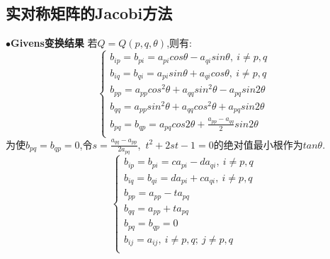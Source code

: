 \documentclass[UTF8]{article}
\newcommand{\keypoint}[2]{$\bullet$\textbf{#1}\quad#2\par}
\begin{document}
\subsection{实对称矩阵的Jacobi方法}
\keypoint{Givens变换结果}{
	若$Q=Q(p,q,\theta)$,则有:
	$$ \left\{
	\begin{array}{l}
	b_{ip}=b_{pi}=a_{pi}cos\theta-a_{qi}sin\theta,\ i\not=p,q\\
	b_{iq}=b_{qi}=a_{pi}sin\theta+a_{qi}cos\theta,\ i\not=p,q\\
	b_{pp}=a_{pp}cos^2\theta+a_{qq}sin^2\theta-a_{pq}sin2\theta\\
	b_{qq}=a_{pp}sin^2\theta+a_{qq}cos^2\theta+a_{pq}sin2\theta\\
	b_{pq}=b_{qp}=a_{pq}cos2\theta+\frac{a_{pp}-a_{qq}}{2}sin2\theta\\
	\end{array}
	\right.
	$$
	为使$b_{pq}=b_{qp}=0$,令$s=\frac{a_{qq}-a_{pp}}{2a_{pq}}$,\ $t^2+2st-1=0$的绝对值最小根作为$tan\theta$.
	$$ \left\{
	\begin{array}{l}
	b_{ip}=b_{pi}=ca_{pi}-da_{qi},\ i\not=p,q\\
	b_{iq}=b_{qi}=da_{pi}+ca_{qi},\ i\not=p,q\\
	b_{pp}=a_{pp}-ta_{pq}\\
	b_{qq}=a_{pp}+ta_{pq}\\
	b_{pq}=b_{qp}=0\\
	b_{ij}=a_{ij},\ i\not=p,q;\ j\not=p,q\\
	\end{array}
	\right.
	$$
}
\end{document}
